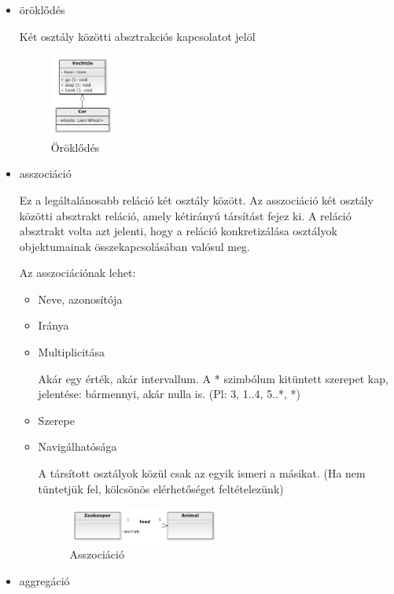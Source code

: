 \documentclass[margin=0px]{article}
\begin{document}
\begin{description}
        \begin{itemize}
            \item öröklődés

                  Két osztály közötti absztrakciós kapcsolatot jelöl
                  \begin{figure}[H]
                      \centering
                      \includegraphics[width=0.2\textwidth]{img/oroklodes.png}
                      \caption{Öröklődés}
                  \end{figure}

            \item asszociáció

                  Ez a legáltalánosabb reláció két osztály között. Az asszociáció két osztály
                  közötti absztrakt reláció, amely kétirányú társítást fejez ki. A
                  reláció absztrakt volta azt jelenti, hogy a reláció konkretizálása osztályok
                  objektumainak összekapcsolásában valósul meg.

                  Az asszociációnak lehet:
                  \begin{itemize}
                      \item Neve, azonosítója
                      \item Iránya
                      \item Multiplicitása

                            Akár egy érték, akár intervallum. A * szimbólum kitüntett szerepet kap, jelentése: bármennyi, akár nulla is. (Pl: 3, 1..4, 5..*, *)
                      \item Szerepe
                      \item Navigálhatósága

                            A társított osztályok közül csak az egyik ismeri a másikat. (Ha nem tüntetjük fel, kölcsönös elérhetőséget feltételezünk)

                            \begin{figure}[H]
                                \centering
                                \includegraphics[width=0.5\textwidth]{img/asszociacio.png}
                                \caption{Asszociáció}
                            \end{figure}
                  \end{itemize}
            \item aggregáció


\end{itemize}
\end{description}
\end{document}
